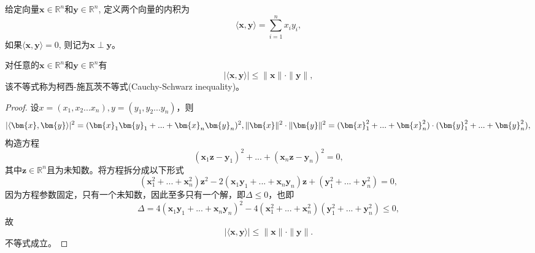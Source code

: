 \begin{definition}[向量内积]
    给定向量$\bm{x} \in \mathbb{R}^{n}$和$\bm{y} \in \mathbb{R}^{n}$, 定义两个向量的内积为
    \begin{equation}
        \langle\bm{x}, \bm{y}\rangle=\sum_{i=1}^{n} x_{i} y_{i},
        \nonumber
    \end{equation}
如果$\langle\bm{x}, \bm{y}\rangle=0$, 则记为$\bm{x} \perp \bm{y}$。
\end{definition}

\begin{theorem}[柯西-施瓦茨不等式]
    对任意的$  \bm{x} \in \mathbb{R}^{n}  $和$  \bm{y} \in \mathbb{R}^{n}  $有
    \begin{equation}
    |\langle\bm{x}, \bm{y}\rangle| \leq\|\bm{x}\| \cdot\|\bm{y}\|,
        \nonumber
    \end{equation}
    该不等式称为柯西-施瓦茨不等式(Cauchy-Schwarz inequality)\cite{2007柯西}。
    \label{thm1_4}
\end{theorem}
\begin{proof}
    设$x=(x_1,x_2...x_n),y=(y_1,y_2...y_n)$，则
    \begin{equation}
        |\langle\bm{x}, \bm{y}\rangle|^2=(\bm{x}_1\bm{y}_1+...+\bm{x}_n\bm{y}_n)^2, \\
        \|\bm{x}\|^2 \cdot\|\bm{y}\|^2=(\bm{x}_1^2+...+\bm{x}_n^2) \cdot(\bm{y}_1^2+...+\bm{y}_n^2), \\
        \nonumber
    \end{equation}
    构造方程
    \begin{equation}
        (\bm{x}_1\bm{z}-\bm{y}_1)^2+...+(\bm{x}_n\bm{z}-\bm{y}_n)^2=0,
        \nonumber
    \end{equation}
    其中$\bm{z} \in \mathbb{R}^{n}$且为未知数。将方程拆分成以下形式
    \begin{equation}
        (\bm{x}_1^2+...+\bm{x}_n^2)\bm{z}^2-2(\bm{x}_1\bm{y}_1+...+\bm{x}_n\bm{y}_n)\bm{z}+(\bm{y}_1^2+...+\bm{y}_n^2)=0,
        \nonumber
    \end{equation}
    因为方程参数固定，只有一个未知数，因此至多只有一个解，即$\Delta \leq 0$，也即
    \begin{equation}
        \Delta=4(\bm{x}_1\bm{y}_1+...+\bm{x}_n\bm{y}_n)^2-4(\bm{x}_1^2+...+\bm{x}_n^2)(\bm{y}_1^2+...+\bm{y}_n^2) \leq 0 ,
        \nonumber
    \end{equation}
    故
    \begin{equation}
        |\langle\bm{x}, \bm{y}\rangle| \leq\|\bm{x}\| \cdot\|\bm{y}\|.
        \nonumber
    \end{equation}
    不等式成立。
\end{proof}

